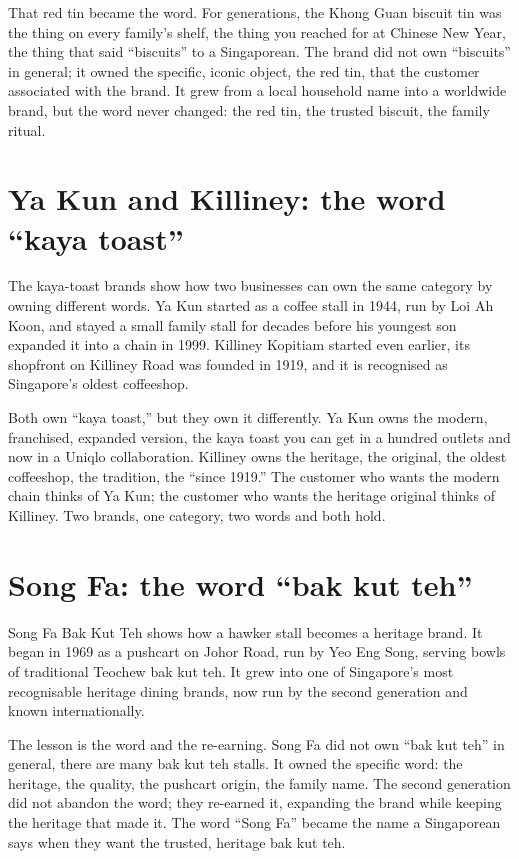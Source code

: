 \documentclass[10pt,twoside,openany]{memoir}
\newcommand{\needspacehead}{\needspace{4\baselineskip}}
\let\oldsection\section
\renewcommand{\section}{\needspacehead\oldsection}
\begin{document}
That red tin became the word. For generations, the Khong Guan biscuit
tin was the thing on every family's shelf, the thing you reached for at
Chinese New Year, the thing that said ``biscuits'' to a Singaporean. The
brand did not own ``biscuits'' in general; it owned the specific, iconic
object, the red tin, that the customer associated with the brand. It
grew from a local household name into a worldwide brand, but the word
never changed: the red tin, the trusted biscuit, the family ritual.

\section{Ya Kun and Killiney: the word ``kaya
toast''}\label{ya-kun-and-killiney-the-word-kaya-toast}

The kaya-toast brands show how two businesses can own the same category
by owning different words. Ya Kun started as a coffee stall in 1944, run
by Loi Ah Koon, and stayed a small family stall for decades before his
youngest son expanded it into a chain in 1999. Killiney Kopitiam started
even earlier, its shopfront on Killiney Road was founded in 1919, and it
is recognised as Singapore's oldest coffeeshop.

Both own ``kaya toast,'' but they own it differently. Ya Kun owns the
modern, franchised, expanded version, the kaya toast you can get in a
hundred outlets and now in a Uniqlo collaboration. Killiney owns the
heritage, the original, the oldest coffeeshop, the tradition, the
``since 1919.'' The customer who wants the modern chain thinks of Ya
Kun; the customer who wants the heritage original thinks of Killiney.
Two brands, one category, two words and both hold.

\section{Song Fa: the word ``bak kut
teh''}\label{song-fa-the-word-bak-kut-teh}

Song Fa Bak Kut Teh shows how a hawker stall becomes a heritage brand.
It began in 1969 as a pushcart on Johor Road, run by Yeo Eng Song,
serving bowls of traditional Teochew bak kut teh. It grew into one of
Singapore's most recognisable heritage dining brands, now run by the
second generation and known internationally.

The lesson is the word and the re-earning. Song Fa did not own ``bak kut
teh'' in general, there are many bak kut teh stalls. It owned the
specific word: the heritage, the quality, the pushcart origin, the
family name. The second generation did not abandon the word; they
re-earned it, expanding the brand while keeping the heritage that made
it. The word ``Song Fa'' became the name a Singaporean says when they
want the trusted, heritage bak kut teh.
\end{document}
